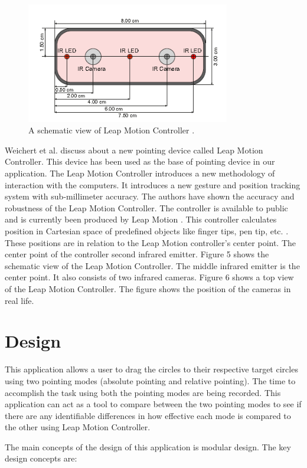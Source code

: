 \documentclass[titlepage]{article}
\begin{document}
\begin{figure}[!h]
\centering
\includegraphics[width=3.5in]{Figure_5}
\caption{A schematic view of Leap Motion Controller \cite{4}.}
\end{figure}

Weichert et al. \cite{4} discuss about a new pointing device called Leap Motion Controller. This device has been used as the base of pointing device in our application. The Leap Motion Controller introduces a new methodology of interaction with the computers. It introduces a new gesture and position tracking system with sub-millimeter accuracy. The authors have shown the accuracy and robustness of the Leap Motion Controller. The controller is available to public and is currently been produced by Leap Motion \cite{5}. This controller calculates position in Cartesian space of predefined objects like finger tips, pen tip, etc. \cite{4}. These positions are in relation to the Leap Motion controller’s center point. The center point of the controller second infrared emitter. Figure 5 shows the schematic view of the Leap Motion Controller. The middle infrared emitter is the center point. It also consists of two infrared cameras. Figure 6 shows a top view of the Leap Motion Controller. The figure shows the position of the cameras in real life.

\section{Design}
This application allows a user to drag the circles to their respective target circles using two pointing modes (absolute pointing and relative pointing). The time to accomplish the task using both the pointing modes are being recorded. This application can act as a tool to compare between the two pointing modes to see if there are any identifiable differences in how effective each mode is compared to the other using Leap Motion Controller. 

The main concepts of the design of this application is modular design. The key design concepts are:
\end{document}
